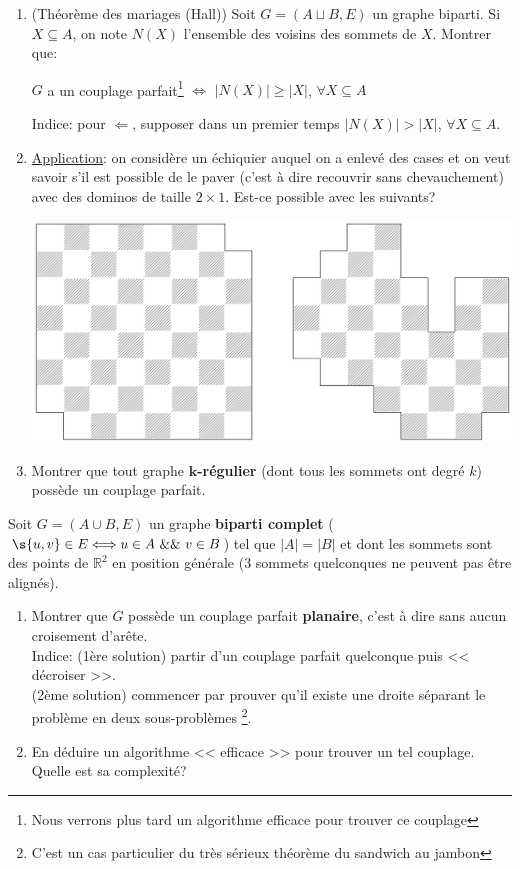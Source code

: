 \documentclass[mp2i]{exam}
\begin{document}
	\begin{enumerate}[resume]
		\item (Théorème des mariages (Hall)) Soit $G = (A \sqcup B, E)$ un graphe biparti. Si $X \subseteq A$, on note $N(X)$ l'ensemble des voisins des sommets de $X$. Montrer que: \begin{center}
			$G$ a un couplage parfait\footnote{Nous verrons plus tard un algorithme efficace pour trouver ce couplage} $\Longleftrightarrow$ $\vert N(X) \vert \geq \vert X \vert$, $\forall X \subseteq A$
		\end{center}
		Indice: pour $\Longleftarrow$, supposer dans un premier temps $\vert N(X) \vert > \vert X \vert$, $\forall X \subseteq A$. 
		\item \underline{Application}: on considère un échiquier auquel on a enlevé des cases et on veut savoir s'il est possible de le paver (c'est à dire recouvrir sans chevauchement) avec des dominos de taille $2\times1$. Est-ce possible avec les suivants? 
		\begin{center}
			\includegraphics[scale = .18]{img/chess.png}
		\end{center}
		\item Montrer que tout graphe \textbf{$\boldsymbol{k}$-régulier} (dont tous les sommets ont degré $k$) possède un couplage parfait.
	\end{enumerate}
	\vspace{\baselineskip}
	
	Soit $G = (A \cup B, E)$ un graphe \textbf{biparti complet} ($\s{u, v} \in E \Longleftrightarrow u \in A~ \&\& ~v \in B$) tel que $\vert A \vert = \vert B \vert$ et dont les sommets sont des points de $\mathbb{R}^2$ en position générale (3 sommets quelconques ne peuvent pas être alignés).
	\begin{enumerate}[resume]
		\item Montrer que $G$ possède un couplage parfait \textbf{planaire}, c'est à dire sans aucun croisement d'arête.\\
		Indice: (1ère solution) partir d'un couplage parfait quelconque puis << décroiser >>.\\
		(2ème solution) commencer par prouver qu'il existe une droite séparant le problème en deux sous-problèmes \footnote{C'est un cas particulier du très sérieux théorème du sandwich au jambon}.
		\item En déduire un algorithme << efficace >> pour trouver un tel couplage. Quelle est sa complexité?
	\end{enumerate}
\end{document}
